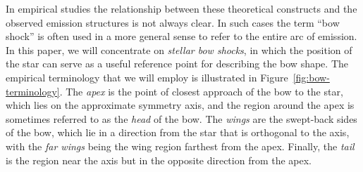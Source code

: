 In empirical studies the relationship between these theoretical
constructs and the observed emission structures is not always clear.
In such cases the term ``bow shock'' is often used in a more general
sense to refer to the entire arc of emission.  In this paper, we will
concentrate on \textit{stellar bow shocks}, in which the position of
the star can serve as a useful reference point for describing the bow
shape.  The empirical terminology that we will employ is illustrated
in Figure~\ref{fig:bow-terminology}.  The \textit{apex} is the point
of closest approach of the bow to the star, which lies on the
approximate symmetry axis, and the region around the apex is sometimes
referred to as the \textit{head} of the bow.  The \textit{wings} are
the swept-back sides of the bow, which lie in a direction from the
star that is orthogonal to the axis, with the \textit{far wings} being
the wing region farthest from the apex. Finally, the \textit{tail} is
the region near the axis but in the opposite direction from the apex.


